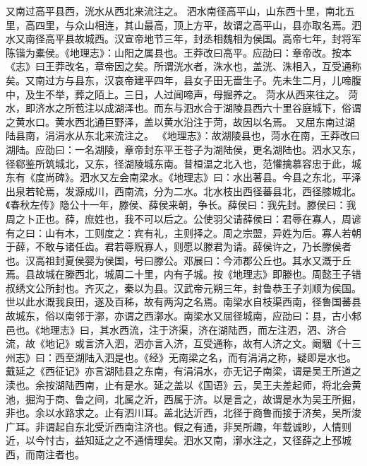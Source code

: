 \documentclass[12pt,UTF8]{ctexbook}
\begin{document}
又南过高平县西，洸水从西北来流注之。
泗水南径高平山，山东西十里，南北五里，高四里，与众山相连，其山最高，顶上方平，故谓之高平山，县亦取名焉。泗水又南径高平县故城西。汉宣帝地节三年，封丞相魏相为侯国。高帝七年，封将军陈锴为橐侯。《地理志》：山阳之属县也。王莽改曰高平。应劭曰：章帝改。按本《志》曰王莽改名，章帝因之矣。所谓洸水者，洙水也，盖洸、洙相入，互受通称矣。又南过方与县东，汉哀帝建平四年，县女子田无啬生子。先未生二月，儿啼腹中，及生不举，葬之陌上。三日，人过闻啼声，母掘养之。
菏水从西来往之。
菏水，即济水之所苞注以成湖泽也。而东与泗水合于湖陵县西六十里谷庭城下，俗谓之黄水口。黄水西北通巨野泽，盖以黄水沿注于菏，故因以名焉。
又屈东南过湖陆县南，涓涓水从东北来流注之。
《地理志》：故湖陵县也，菏水在南，王莽改曰湖陆。应劭曰：一名湖陵，章帝封东平王苍子为湖陆侯，更名湖陆也。泗水又东，径郗鉴所筑城北，又东，径湖陵城东南。昔桓温之北入也，范懽擒慕容忠于此，城东有《度尚碑》。泗水又左会南梁水。《地理志》曰：水出著县。今县之东北，平泽出泉若轮焉，发源成川，西南流，分为二水。北水枝出西径蕃县北，西径膝城北。《春秋左传》隐公十一年，滕侯、薛侯来朝，争长。薛侯曰：我先封。滕侯曰：我周之卜正也。薛，庶姓也，我不可以后之。公使羽父请薛侯曰：君辱在寡人，周谚有之曰：山有木，工则度之：宾有礼，主则择之。周之宗盟，异姓为后。寡人若朝于薛，不敢与诸任齿。君若辱贶寡人，则愿以滕君为请。薛侯许之，乃长滕侯者也。汉高祖封夏侯婴为侯国，号曰滕公。邓展曰：今沛郡公丘也。其水又溉于丘焉。县故城在滕西北，城周二十里，内有子城。按《地理志》即滕也。周懿王子错叔绣文公所封也。齐灭之，秦以为县。汉武帝元朔三年，封鲁恭王子刘顺为侯国。世以此水溉我良田，遂及百秭，故有两沟之名焉。南梁水自枝渠西南，径鲁国蕃县故城东，俗以南邻于漷，亦谓之西漷水。南梁水又屈径城南，应劭曰：县，古小邾邑也。《地理志》曰，其水西流，注于济渠，济在湖陆西，而左注泗，泗、济合流，故《地记》或言济入泗，泗亦言入济，互受通称，故有人济之文。阚駰《十三州志》曰：西至湖陆入泗是也。《经》无南梁之名，而有涓涓之称，疑即是水也。戴延之《西征记》亦言湖陆县之东南，有涓涓水，亦无记子南梁，谓是吴王所道之渎也。余按湖陆西南，止有是水。延之盖以《国语》云，吴王夫差起师，将北会黄池，掘沟于商、鲁之间，北属之沂，西属于济。以是言之，故谓是水为吴王所掘，非也。余以水路求之。止有泗川耳。盖北达沂西，北径于商鲁而接于济矣，吴所浚广耳。非谓起自东北受沂西南注济也。假之有通，非吴所趣，年载诚眇，人情则近，以今忖古，益知延之之不通情理矣。泗水又南，漷水注之，又径薛之上邳城西，而南注者也。
\end{document}

